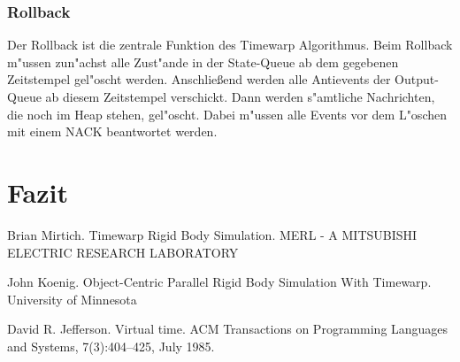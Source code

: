 \documentclass[a4paper, 10pt, openright, parskip, chapterprefix]{scrreprt}
\begin{document}
\subsection{Rollback}
\label{subsec:Rollback}
Der Rollback ist die zentrale Funktion des Timewarp Algorithmus. Beim Rollback m"ussen zun"achst alle Zust"ande in der
State-Queue ab dem gegebenen Zeitstempel gel"oscht werden. Anschlie\ss end werden alle Antievents der Output-Queue ab
diesem Zeitstempel verschickt. Dann werden s"amtliche Nachrichten, die noch im Heap stehen, gel"oscht. Dabei m"ussen
alle Events vor dem L"oschen mit einem NACK beantwortet werden.

\chapter{Fazit}
\begin{thebibliography}{10}
Brian Mirtich. Timewarp Rigid Body Simulation. MERL - A MITSUBISHI ELECTRIC RESEARCH LABORATORY

John Koenig. Object-Centric Parallel Rigid Body Simulation With Timewarp. University of Minnesota

David R. Jefferson. Virtual time. ACM Transactions on Programming Languages and Systems, 7(3):404–425, July 1985.
\end{thebibliography}
\end{document}
